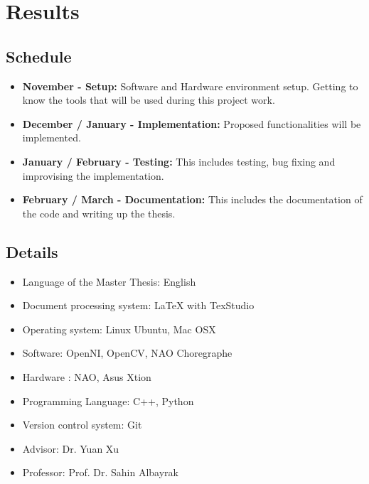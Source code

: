 \chapter{Results}
\section{Schedule}
\begin{itemize}
	\item \textbf{November - Setup:} Software and Hardware environment setup. Getting to know the tools that will be used during this project work.
	\item \textbf{December / January - Implementation:} Proposed functionalities will be implemented.
	\item \textbf{January / February - Testing:} This includes testing, bug fixing and improvising the implementation.
	\item \textbf{February / March - Documentation:} This includes the documentation of the code and writing up the thesis.
\end{itemize}

\section{Details}
\begin{itemize}
	\item Language of the Master Thesis: English
	\item Document processing system: LaTeX with TexStudio
	\item Operating system: Linux Ubuntu, Mac OSX
	\item Software: OpenNI, OpenCV, NAO Choregraphe
	\item Hardware : NAO, Asus Xtion
	\item Programming Language: C++, Python
	\item Version control system: Git
	\item Advisor: Dr. Yuan Xu
	\item Professor: Prof. Dr. Sahin Albayrak
\end{itemize}
